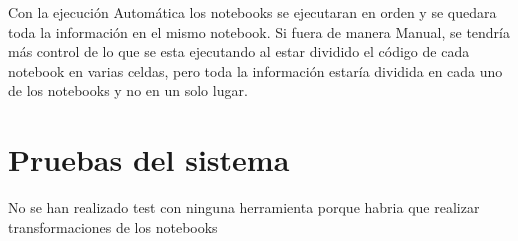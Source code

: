 Con la ejecución Automática los notebooks se ejecutaran en orden y se quedara toda la información en el mismo notebook.
Si fuera de manera Manual, se tendría más control de lo que se esta ejecutando al estar dividido el código de cada notebook en varias celdas, pero toda la información estaría dividida en cada uno de los notebooks y no en un solo lugar.



\section{Pruebas del sistema}

No se han realizado test con ninguna herramienta porque habria que realizar transformaciones de los notebooks


